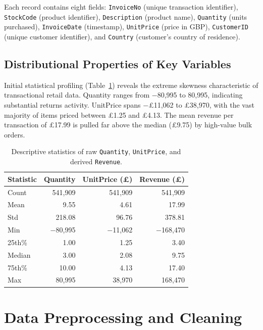 \documentclass[12pt,a4paper]{article}
\begin{document}
Each record contains eight fields: \texttt{InvoiceNo} (unique transaction identifier),
\texttt{StockCode} (product identifier), \texttt{Description} (product name),
\texttt{Quantity} (units purchased), \texttt{InvoiceDate} (timestamp),
\texttt{UnitPrice} (price in GBP), \texttt{CustomerID} (unique customer identifier),
and \texttt{Country} (customer's country of residence).

\subsection{Distributional Properties of Key Variables}

Initial statistical profiling (Table~\ref{tab:raw_stats}) reveals the extreme skewness
characteristic of transactional retail data.  Quantity ranges from $-$80,995 to 80,995,
indicating substantial returns activity.  UnitPrice spans $-$\pounds11,062 to
\pounds38,970, with the vast majority of items priced between \pounds1.25 and \pounds4.13.
The mean revenue per transaction of \pounds17.99 is pulled far above the median
(\pounds9.75) by high-value bulk orders.

\begin{table}[H]
  \centering
  \caption{Descriptive statistics of raw \texttt{Quantity}, \texttt{UnitPrice}, and derived \texttt{Revenue}.}
  \label{tab:raw_stats}
  \begin{tabular}{lrrr}
    \toprule
    \textbf{Statistic} & \textbf{Quantity} & \textbf{UnitPrice (\pounds)} & \textbf{Revenue (\pounds)} \\
    \midrule
    Count  & 541,909  & 541,909  & 541,909  \\
    Mean   & 9.55     & 4.61     & 17.99    \\
    Std    & 218.08   & 96.76    & 378.81   \\
    Min    & $-$80,995 & $-$11,062 & $-$168,470 \\
    25th\% & 1.00     & 1.25     & 3.40     \\
    Median & 3.00     & 2.08     & 9.75     \\
    75th\% & 10.00    & 4.13     & 17.40    \\
    Max    & 80,995   & 38,970   & 168,470  \\
    \bottomrule
  \end{tabular}
\end{table}

\section{Data Preprocessing and Cleaning}
\end{document}
